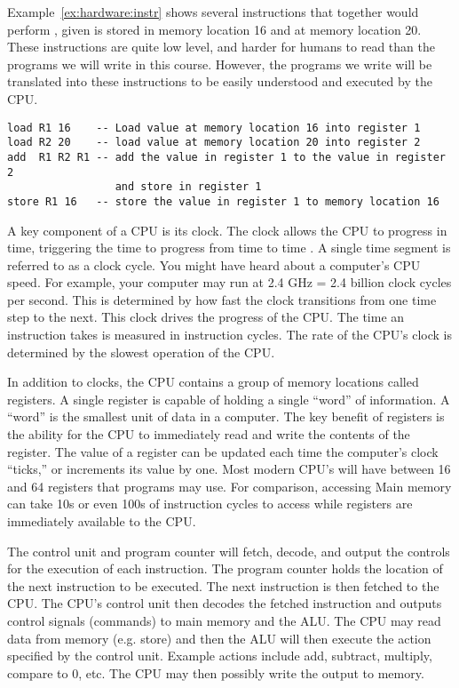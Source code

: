 Example~\ref{ex:hardware:instr} shows several instructions
that together would perform , given  is stored in memory
location 16 and  at memory location 20. These instructions are quite low
level, and harder for humans to read than the programs we will write in this course.
However, the programs we write will be translated into these instructions to be
easily understood and executed by the CPU.

\begin{example}
\label{ex:hardware:instr}
\begin{verbatim}
load R1 16    -- Load value at memory location 16 into register 1
load R2 20    -- load value at memory location 20 into register 2
add  R1 R2 R1 -- add the value in register 1 to the value in register 2
                 and store in register 1
store R1 16   -- store the value in register 1 to memory location 16
\end{verbatim}
\end{example}

A key component of a CPU is its clock. The clock allows the CPU to progress in time,
triggering the time to progress from time  to time . A single time
segment is referred to as a clock cycle. You might have heard about a computer's CPU
speed. For example, your computer may run at 2.4 GHz = 2.4 billion clock cycles per second. This
is determined by how fast the clock transitions from one time step to the next. This
clock drives the progress of the CPU. The time an instruction takes is measured
in instruction cycles. The rate of the CPU's clock is determined by the slowest
operation of the CPU.

In addition to clocks, the CPU contains a group of memory locations called registers.
A single register is capable of holding a single ``word'' of information. A ``word'' is the smallest
unit of data in a computer. The key benefit of registers is the ability for the
CPU to immediately read and write the contents of the register. The value of a register
can be updated each time the computer's clock ``ticks,'' or increments its value by one. 
Most modern CPU's will have between 16 and 64 registers that programs may use.
For comparison, accessing Main memory can take 10s or even 100s of instruction
cycles to access while registers are immediately available to the CPU.

The control unit and program counter will fetch, decode, and output the
controls for the execution of each instruction. The program counter holds the
location of the next instruction to be executed. The next instruction is then
fetched to the CPU. The CPU's control unit then decodes the fetched instruction
and outputs control signals (commands) to main memory and the ALU. The CPU may
read data from memory (e.g. store) and then the ALU will then execute the action
specified by the control unit. Example actions include add, subtract, multiply, compare to 0, etc.
The CPU may then possibly write the output to memory.

